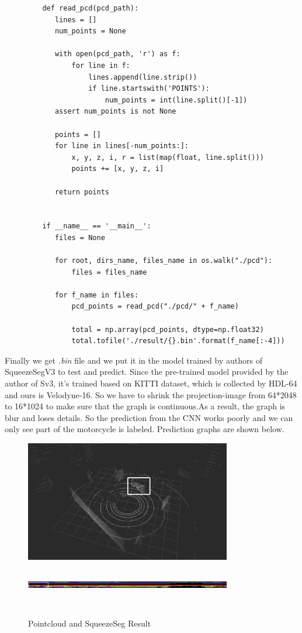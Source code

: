 \documentclass{article}
\begin{document}
\begin{normalsize}
\begin{lstlisting}
         def read_pcd(pcd_path):
            lines = []
            num_points = None

            with open(pcd_path, 'r') as f:
                for line in f:
                    lines.append(line.strip())
                    if line.startswith('POINTS'):
                        num_points = int(line.split()[-1])
            assert num_points is not None

            points = []
            for line in lines[-num_points:]:
                x, y, z, i, r = list(map(float, line.split()))
                points += [x, y, z, i]

            return points


         if __name__ == '__main__':
            files = None

            for root, dirs_name, files_name in os.walk("./pcd"):
                files = files_name

            for f_name in files:
                pcd_points = read_pcd("./pcd/" + f_name)

                total = np.array(pcd_points, dtype=np.float32)
                total.tofile('./result/{}.bin'.format(f_name[:-4]))
         \end{lstlisting}
         Finally we get \emph{.bin} file and we put it in the model trained by authors of SqueezeSegV3 to test and predict. Since the pre-trained model provided by the author of Sv3, it’s trained based on KITTI dataset, which is collected by HDL-64 and ours is Velodyne-16. So we have to shrink the projection-image from 64*2048 to 16*1024 to make sure that the graph is continuous.As a result, the graph is blur and loses details. So the prediction from the CNN works poorly and we can only see part of the motorcycle is labeled. Prediction graphs are shown below.
         \begin{figure}[htbp]
            \centering
            \includegraphics[width=9cm]{pointc1.png}
            \quad
            \includegraphics[width=9cm ,height = 2cm]{pointc2.png}
            \quad
            \caption{Pointcloud and SqueezeSeg Result}
        \end{figure}


\end{normalsize}
\end{document}
